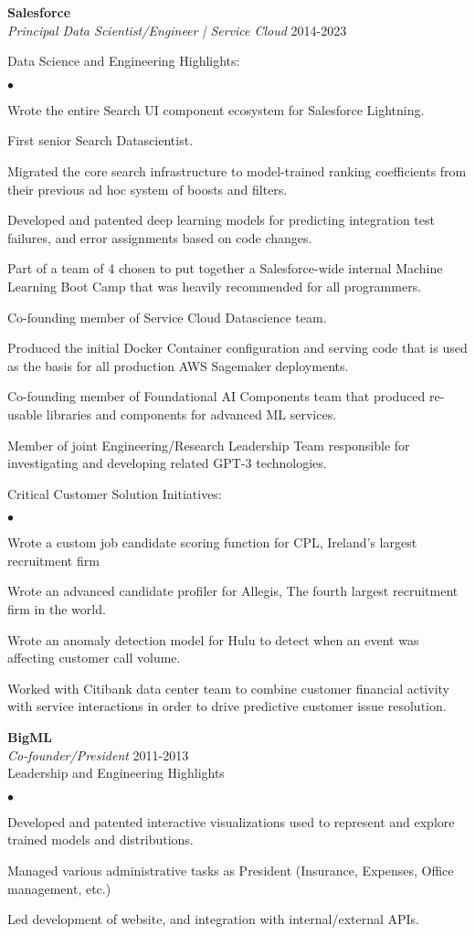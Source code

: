 \documentclass[margin,line]{res}
\newenvironment{list2}{
  \begin{list}{$\bullet$}{%
      \setlength{\itemsep}{0in}
      \setlength{\parsep}{0in} \setlength{\parskip}{0in}
      \setlength{\topsep}{0in} \setlength{\partopsep}{0in} 
      \setlength{\leftmargin}{0.2in}}}{\end{list}}
\begin{document}
\begin{resume}
{\bf Salesforce} \\
{\em Principal Data Scientist/Engineer | Service Cloud} \hfill 2014-2023

Data Science and Engineering Highlights:
\begin{list2}
  \item Wrote the entire Search UI component ecosystem for Salesforce Lightning.
  \item First senior Search Datascientist.
  \item Migrated the core search infrastructure to model-trained ranking coefficients from their previous ad hoc system of boosts and filters.
  \item Developed and patented deep learning models for predicting integration test failures, and error assignments based on code changes.
  \item Part of a team of 4 chosen to put together a Salesforce-wide internal Machine Learning Boot Camp that was heavily recommended for all programmers.
  \item Co-founding member of Service Cloud Datascience team.
  \item Produced the initial Docker Container configuration and serving code that is used as the basis for all production AWS Sagemaker deployments.
  \item Co-founding member of Foundational AI Components team that produced re-usable libraries and components for advanced ML services.
  \item Member of joint Engineering/Research Leadership Team responsible for investigating and developing related GPT-3 technologies.
\end{list2}

Critical Customer Solution Initiatives:
  \begin{list2}
  \item Wrote a custom job candidate scoring function for CPL, Ireland’s largest recruitment firm
  \item Wrote an advanced candidate profiler for Allegis, The fourth largest recruitment firm in the world.
  \item Wrote an anomaly detection model for Hulu to detect when an event was affecting customer call volume.
  \item Worked with Citibank data center team to combine customer financial activity with service interactions in order to drive predictive customer issue resolution.
\end{list2}

{\bf BigML} \\
{\em Co-founder/President} \hfill 2011-2013\\
Leadership and Engineering Highlights
\begin{list2}
  \item Developed and patented interactive visualizations used to represent and explore trained models and distributions.
  \item Managed various administrative tasks as President (Insurance, Expenses, Office management, etc.)
  \item Led development of website, and integration with internal/external APIs.
\end{list2}



\end{resume}
\end{document}
